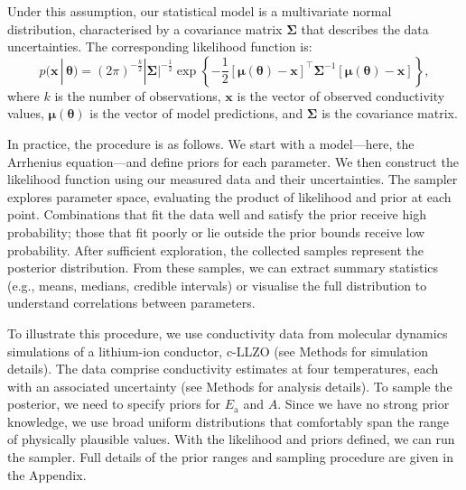 \documentclass[reprint,superscriptaddress,nobibnotes,nofootinbib,amsmath,amssymb,aps,hidelinks]{revtex4-2}
\newcommand{\pr}[2]{p(#1\,|\,#2)}
\begin{document}
Under this assumption, our statistical model is a multivariate normal distribution, characterised by a covariance matrix $\bm{\Sigma}$ that describes the data uncertainties.
The corresponding likelihood function is:
    \begin{equation}
        \pr{\bm{x}}{\bm{\theta}} = (2\pi)^{-\frac{k}{2}}|\bm{\Sigma}|^{-\frac{1}{2}}\exp\left\{-\frac{1}{2}\left[\bm{\mu}(\bm{\theta}) - \bm{x}\right]^\top\bm{\Sigma}^{-1}\left[\bm{\mu}(\bm{\theta}) - \bm{x}\right]\right\},
        \label{eqn:gen}
    \end{equation}
%
where $k$ is the number of observations, $\bm{x}$ is the vector of observed conductivity values, $\bm{\mu}(\bm{\theta})$ is the vector of model predictions, and $\bm{\Sigma}$ is the covariance matrix.

In practice, the procedure is as follows. 
We start with a model---here, the Arrhenius equation---and define priors for each parameter. 
We then construct the likelihood function using our measured data and their uncertainties. 
The sampler explores parameter space, evaluating the product of likelihood and prior at each point. 
Combinations that fit the data well and satisfy the prior receive high probability; those that fit poorly or lie outside the prior bounds receive low probability. 
After sufficient exploration, the collected samples represent the posterior distribution. 
From these samples, we can extract summary statistics (e.g., means, medians, credible intervals) or visualise the full distribution to understand correlations between parameters.

To illustrate this procedure, we use conductivity data from molecular dynamics simulations of a lithium-ion conductor, c-LLZO (see Methods for simulation details).
The data comprise conductivity estimates at four temperatures, each with an associated uncertainty (see Methods for analysis details).
To sample the posterior, we need to specify priors for $E_\mathrm{a}$ and $A$. 
Since we have no strong prior knowledge, we use broad uniform distributions that comfortably span the range of physically plausible values. 
With the likelihood and priors defined, we can run the sampler. 
Full details of the prior ranges and sampling procedure are given in the Appendix.
\end{document}
